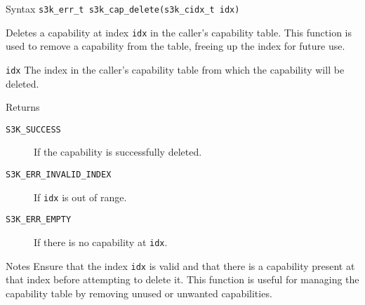\documentclass[a4paper,11pt]{article}
\newenvironment{syscalldoc}[1]{
  \begin{tcolorbox}[breakable,title=\subsection{\texttt{#1()}}]
  \begin{description}[leftmargin=!,style=nextline,noitemsep]
}{
  \end{description}
  \end{tcolorbox}
}
\begin{document}
\begin{syscalldoc}{s3k\_cap\_delete}
  \item[Syntax] \lstinline{s3k_err_t s3k_cap_delete(s3k_cidx_t idx)}

  \item[Description] Deletes a capability at index \verb|idx| in the caller's capability table. This function is used to remove a capability from the table, freeing up the index for future use.

  \item[Parameters]
    \begin{description}
      \item[]
      \item[\texttt{idx}] The index in the caller's capability table from which the capability will be deleted.
    \end{description}

  \item[Returns]
    \begin{description}
      \item[]
      \item[\texttt{S3K\_SUCCESS}] If the capability is successfully deleted.
      \item[\texttt{S3K\_ERR\_INVALID\_INDEX}] If \verb|idx| is out of range.
      \item[\texttt{S3K\_ERR\_EMPTY}] If there is no capability at \verb|idx|.
    \end{description}

  \item[Notes] Ensure that the index \verb|idx| is valid and that there is a capability present at that index before attempting to delete it. This function is useful for managing the capability table by removing unused or unwanted capabilities.
\end{syscalldoc}
\end{document}
